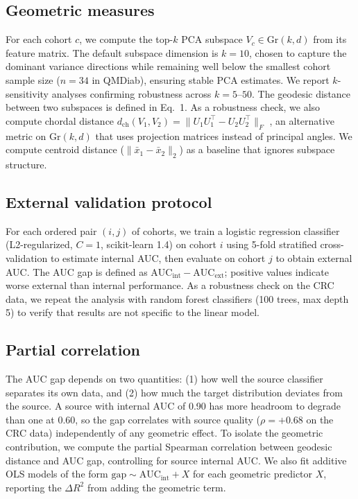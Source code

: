\documentclass{article}
\begin{document}
\subsection{Geometric measures}

For each cohort $c$, we compute the top-$k$ PCA subspace $V_c \in \mathrm{Gr}(k, d)$ from its feature matrix. The default subspace dimension is $k = 10$, chosen to capture the dominant variance directions while remaining well below the smallest cohort sample size ($n = 34$ in QMDiab), ensuring stable PCA estimates. We report $k$-sensitivity analyses confirming robustness across $k = 5$--$50$. The geodesic distance between two subspaces is defined in Eq.~1. As a robustness check, we also compute chordal distance $d_{\mathrm{ch}}(V_1, V_2) = \|U_1 U_1^\top - U_2 U_2^\top\|_F$ \citep{conway1996functions}, an alternative metric on $\mathrm{Gr}(k, d)$ that uses projection matrices instead of principal angles. We compute centroid distance ($\|\bar{x}_1 - \bar{x}_2\|_2$) as a baseline that ignores subspace structure.

\subsection{External validation protocol}

For each ordered pair $(i, j)$ of cohorts, we train a logistic regression classifier (L2-regularized, $C = 1$, scikit-learn 1.4) on cohort $i$ using 5-fold stratified cross-validation to estimate internal AUC, then evaluate on cohort $j$ to obtain external AUC. The AUC gap is defined as $\text{AUC}_{\mathrm{int}} - \text{AUC}_{\mathrm{ext}}$; positive values indicate worse external than internal performance. As a robustness check on the CRC data, we repeat the analysis with random forest classifiers (100 trees, max depth 5) to verify that results are not specific to the linear model.

\subsection{Partial correlation}

The AUC gap depends on two quantities: (1) how well the source classifier separates its own data, and (2) how much the target distribution deviates from the source. A source with internal AUC of 0.90 has more headroom to degrade than one at 0.60, so the gap correlates with source quality ($\rho = +0.68$ on the CRC data) independently of any geometric effect. To isolate the geometric contribution, we compute the partial Spearman correlation between geodesic distance and AUC gap, controlling for source internal AUC. We also fit additive OLS models of the form $\mathrm{gap} \sim \mathrm{AUC_{int}} + X$ for each geometric predictor $X$, reporting the $\Delta R^2$ from adding the geometric term.
\end{document}

